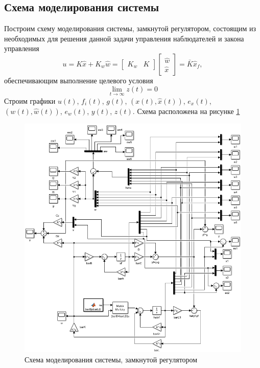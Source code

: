 \documentclass[a4paper, 12pt]{article}
\begin{document}
    \subsection{Схема моделирования системы}
    Построим схему моделирования системы, замкнутой регулятором,
    состоящим из необходимых для решения данной задачи управления наблюдателей и закона
    управления $$u=K\hat{x}+K_w\hat{w}=\begin{bmatrix}K_w &K\end{bmatrix}\begin{bmatrix}
        \hat{w}\\ \hat{x}
    \end{bmatrix}=\bar{K}\hat{x}_f,$$ обеспечивающим выполнение целевого условия $$\lim\limits_{t\to\infty}z(t)=0$$ 
    Строим графики $u(t)$, $f_i(t)$, $g(t)$, $(x(t),\hat{x}(t))$, $e_x(t)$, $(w(t),\hat{w}(t))$, $e_w(t)$, $y(t)$, $z(t)$.
    Схема расположена на рисунке \ref{fig:2task_scheme}
    \begin{figure}[H]
        \centering
        \includegraphics[scale=0.75]{2task_scheme.png}
        \captionsetup{skip=0pt}
        \caption{Схема моделирования системы, замкнутой регулятором}
        \label{fig:2task_scheme}
    \end{figure}
\end{document}
